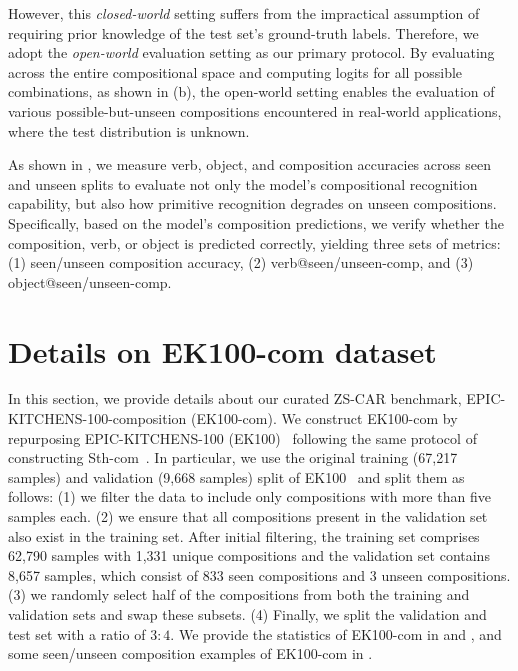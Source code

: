 However, this \textit{closed-world} setting suffers from the impractical assumption of requiring prior knowledge of the test set's ground-truth labels. 
Therefore, we adopt the \textit{open-world} evaluation setting as our primary protocol. 
By evaluating across the entire compositional space and computing logits for all possible combinations, as shown in  (b), the open-world setting enables the evaluation of various possible-but-unseen compositions encountered in real-world applications, where the test distribution is unknown.


As shown in , we measure verb, object, and composition accuracies across seen and unseen splits to evaluate not only the model's compositional recognition capability, but also how primitive recognition degrades on unseen compositions. 
Specifically, based on the model's composition predictions, we verify whether the composition, verb, or object is predicted correctly, yielding three sets of metrics: (1) seen/unseen composition accuracy, (2) verb@seen/unseen-comp, and (3) object@seen/unseen-comp.





\section{Details on EK100-com dataset}
\label{sec:ek100-com}

In this section, we provide details about our curated ZS-CAR benchmark, EPIC-KITCHENS-100-composition (EK100-com).
We construct EK100-com by repurposing EPIC-KITCHENS-100 (EK100)~\cite{damen2022ek100} following the same protocol of constructing Sth-com~\cite{li2024c2c}.
In particular, we use the original training (67,217 samples) and validation (9,668 samples) split of EK100~\cite{damen2022ek100} and split them as follows: 
(1) we filter the data to include only compositions with more than five samples each.
(2) we ensure that all compositions present in the validation set also exist in the training set.
After initial filtering, the training set comprises 62,790 samples with 1,331 unique compositions and the validation set contains 8,657 samples, which consist of 833 seen compositions and 3 unseen compositions.
(3) we randomly select half of the compositions from both the training and validation sets and swap these subsets.
(4) Finally, we split the validation and test set with a ratio of $3:4$.
We provide the statistics of EK100-com in  and , and some seen/unseen composition examples of EK100-com in .

